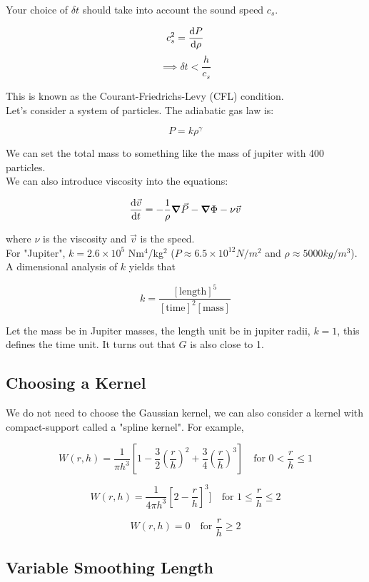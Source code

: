 \documentclass[]{article}
\begin{document}
Your choice of $\delta t$ should take into account the sound speed $c_s$.

\[c_s^2 = \dv{P}{\rho}\]
\[\implies \delta t < \frac{h}{c_s}\]

This is known as the Courant-Friedrichs-Levy (CFL) condition.\\

Let's consider a system of particles. The adiabatic gas law is:

\[P = k\rho^\gamma\]

We can set the total mass to something like the mass of jupiter with 400 particles.\\

We can also introduce viscosity into the equations:

\[\dv{\vec{v}}{t} = -\frac{1}{\rho}\grad{\vec{P}} - \grad{\Phi} - \nu \vec{v}\]

where $\nu$ is the viscosity and $\vec{v}$ is the speed.\\

For "Jupiter", $k = 2.6 \times 10^5$ Nm$^4$/kg$^2$ ($P \approx 6.5 \times 10^12 N/m^2$ and $\rho \approx 5000 kg/m^3$). \\

A dimensional analysis of $k$ yields that 

\[k = \frac{[\text{length}]^5}{[\text{time}]^2[\text{mass}]}\]

Let the mass be in Jupiter masses, the length unit be in jupiter radii, $k = 1$, this defines the time unit. It turns out that $G$ is also close to 1.\\


\subsection{Choosing a Kernel}\bigbreak

We do not need to choose the Gaussian kernel, we can also consider a kernel with compact-support called a "spline kernel". For example,

\[W(r, h) = \frac{1}{\pi h^3}[1- \frac{3}{2}(\frac{r}{h})^2 + \frac{3}{4}(\frac{r}{h})^3] \quad \text{for } 0< \frac{r}{h} \leq 1 \]

\[W(r, h) = \frac{1}{4 \pi h^3}[2- \frac{r}{h}]^3] \quad \text{for } 1 \leq \frac{r}{h} \leq 2\]

\[W(r, h) = 0 \quad \text{for } \frac{r}{h} \geq 2\]


\subsection{Variable Smoothing Length}\bigbreak
\end{document}
